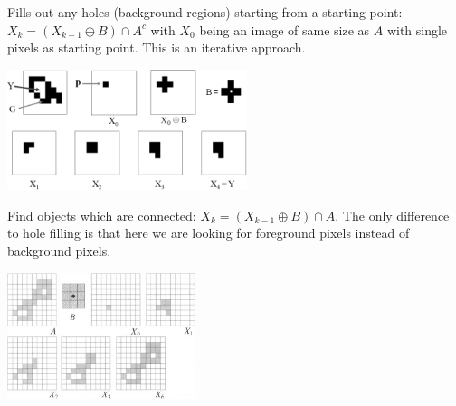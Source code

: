   \vspace{1em}
  \begin{minipage}{9.2cm}
      Fills out any holes (background regions) starting from a starting point: 
      $X_k = (X_{k-1} \oplus B) \cap A^c$ with $X_0$ being an image of same size as $A$ with single 
      pixels as starting point. This is an iterative approach.
      
      \includegraphics[width=7cm]{./images/morphology_hole_filling.png}
  \end{minipage}
  \hspace{0.6cm}
  \begin{minipage}{9.2cm}
      Find objects which are connected: $X_k = (X_{k-1} \oplus B) \cap A$.
      The only difference to hole filling is that here we are looking for foreground pixels instead of
      background pixels.
      \begin{flushright}
        \includegraphics[width=5.5cm]{./images/morphology_connected_components.jpg}
      \end{flushright}
  \end{minipage}
  
